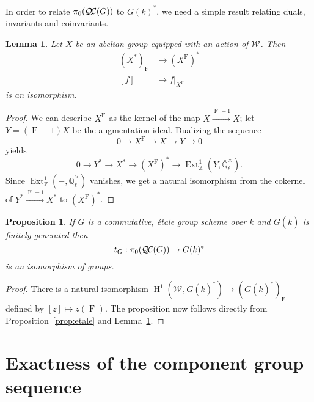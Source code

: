 \documentclass{amsart}
\theoremstyle{plain}
\newtheorem{proposition}[theorem]{Proposition}
\newtheorem{lemma}[theorem]{Lemma}
\theoremstyle{definition}
\theoremstyle{remark}
\newcommand{\ZZ}{{\mathbb{Z}}}
\newcommand{\EE}{\mathbb{\bar Q}_\ell}
\newcommand{\bFq}{\bar{k}}
\newcommand{\Fq}{k}
\newcommand{\EEx}{\EE^\times}
\newcommand{\Weil}[1]{\mathcal{W}_{#1}}
\newcommand{\Frob}[1]{\operatorname{F}_{#1}}
\DeclareMathOperator{\Ext}{Ext}
\DeclareMathOperator{\Hh}{H}
\newcommand{\QC}{{\mathcal{Q\hskip-0.8pt C}}}
\newcommand{\QCiso}[1]{\pi_0 (\QC(#1))}
\newcommand{\trFrob}[1]{t_{#1}}
\begin{document}
In order to relate $\QCiso{G}$ to $G(k)^*$, we need a simple result relating duals, invariants and coinvariants.

\begin{lemma} \label{lem:dual-inv}
Let $X$ be an abelian group equipped with an action of $\Weil{}$.
 Then
\begin{align*}
 (X^*)_{\Frob{}} &\to (X^{\Frob{}})^* \\
 [f] &\mapsto f|_{X^{\Frob{}}}
\end{align*}
is an isomorphism.
\end{lemma}
\begin{proof}
We can describe $X^{\Frob{}}$ as the kernel of the map $X \xrightarrow{\Frob{}-1} X$;
let $Y = (\Frob{}-1)X$ be the augmentation ideal.  Dualizing the sequence
\[
 0 \to X^{\Frob{}} \to X \to Y \to 0
\]
yields
\[
 0 \to Y^* \to X^* \to (X^{\Frob{}})^* \to \Ext^1_\ZZ(Y, \EEx).
\]
Since $\Ext^1_\ZZ(-,\EEx)$ vanishes, we get a natural isomorphism from the cokernel of $Y^* \xrightarrow{\Frob{}-1} X^*$ to $(X^{\Frob{}})^*$.
\end{proof}

\begin{proposition} \label{prop:etale-iso}
 If $G$ is a commutative, \'etale group scheme over $\Fq$ and $G(\bFq)$ is finitely
 generated then
 \[
  \trFrob{G} : \QCiso{G} \to G(\Fq)^*
 \]
 is an isomorphism of groups.
\end{proposition}
\begin{proof}
There is a natural isomorphism $\Hh^1(\Weil{}, G(\bFq)^*) \to (G(\bFq)^*)_{\Frob{}}$
defined by $[z] \mapsto z(\Frob{})$.  The proposition now follows directly
from Proposition~\ref{prop:etale} and Lemma~\ref{lem:dual-inv}.
\end{proof}

\section{Exactness of the component group sequence} \label{sec:restriction}
\end{document}
